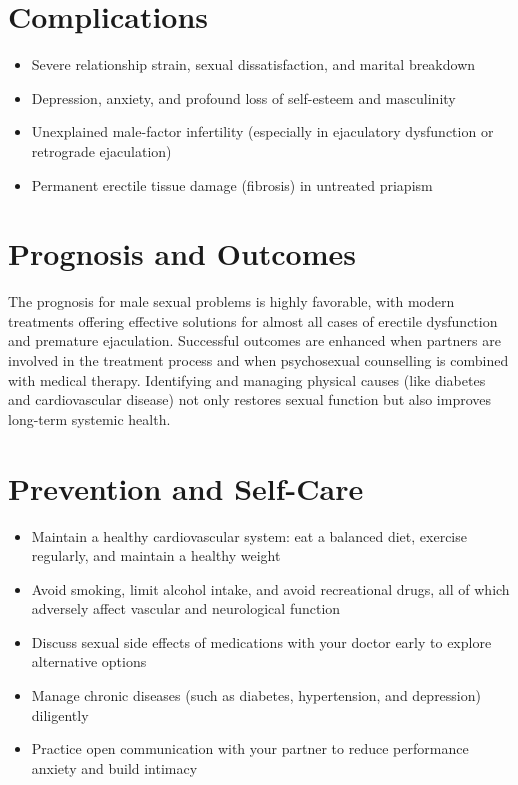 \section*{Complications}
\begin{itemize}
    \item Severe relationship strain, sexual dissatisfaction, and marital breakdown
    \item Depression, anxiety, and profound loss of self-esteem and masculinity
    \item Unexplained male-factor infertility (especially in ejaculatory dysfunction or retrograde ejaculation)
    \item Permanent erectile tissue damage (fibrosis) in untreated priapism
\end{itemize}

\section*{Prognosis and Outcomes}
The prognosis for male sexual problems is highly favorable, with modern treatments offering effective solutions for almost all cases of erectile dysfunction and premature ejaculation. Successful outcomes are enhanced when partners are involved in the treatment process and when psychosexual counselling is combined with medical therapy. Identifying and managing physical causes (like diabetes and cardiovascular disease) not only restores sexual function but also improves long-term systemic health.

\section*{Prevention and Self-Care}
\begin{itemize}
    \item Maintain a healthy cardiovascular system: eat a balanced diet, exercise regularly, and maintain a healthy weight
    \item Avoid smoking, limit alcohol intake, and avoid recreational drugs, all of which adversely affect vascular and neurological function
    \item Discuss sexual side effects of medications with your doctor early to explore alternative options
    \item Manage chronic diseases (such as diabetes, hypertension, and depression) diligently
    \item Practice open communication with your partner to reduce performance anxiety and build intimacy
\end{itemize}


